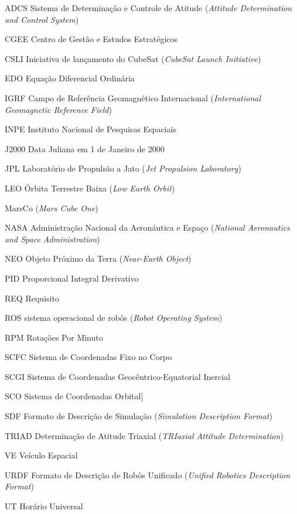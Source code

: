 \documentclass[
	12pt,					%
	openright,				%
	twoside,					%
	a4paper,					%
	english,					%
	brazil					%
	]{abntex2}
\numberwithin{equation}{subsection}
\begin{document}
\begin{siglas}
	\item[ADCS] Sistema de Determinação e Controle de Atitude (\textit{Attitude Determination and Control System})
	\item[CGEE] Centro de Gestão e Estudos Estratégicos
	\item[CSLI] Iniciativa de lançamento do CubeSat  (\textit{CubeSat Launch Initiative})
	\item [EDO] Equação Diferencial Ordinária
	\item[IGRF] Campo de Referência Geomagnético Internacional (\textit{International Geomagnetic Reference Field})
	\item[INPE] Instituto Nacional de Pesquisas Espaciais
	\item[J2000] Data Juliana em 1 de Janeiro de 2000
	\item[JPL] Laboratório de Propulsão a Jato (\textit{Jet Propulsion Laboratory})
	\item[LEO] Órbita Terrestre Baixa (\textit{Low Earth Orbit})
	\item[MarsCo] (\textit{Mars Cube One})
	\item[NASA] Administração Nacional da Aeronáutica e Espaço (\textit{National Aeronautics and Space Administration})
	\item[NEO] Objeto Próximo da Terra (\textit{Near-Earth Object})  
	\item[PID] Proporcional Integral Derivativo
	\item[REQ] Requisito
	\item[ROS] sistema operacional de robôs (\textit{Robot Operating System})
	\item[RPM] Rotações Por Minuto
	\item[SCFC] Sistema de Coordenadas Fixo no Corpo
	\item[SCGI] Sistema de Coordenadas Geocêntrico-Equatorial Inercial
	\item[SCO] Sistema de Coordenadas Orbital]
	\item[SDF] Formato de Descrição de Simulação (\textit{Simulation Description Format})
	\item[TRIAD] Determinação de Atitude Triaxial (\textit{TRIaxial Attitude Determination})  
	\item[VE] Veículo Espacial  
	\item[URDF] Formato de Descrição de Robôs  Unificado (\textit{Unified Robotics Description Format}) 
	\item[UT] Horário Universal  
\end{siglas}
\end{document}
